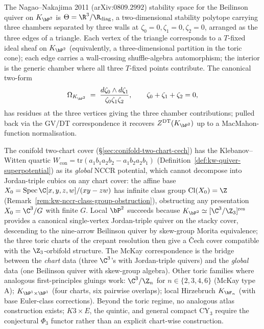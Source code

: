 \begin{remark}
\label{rem:local-p2-stability-polytope}
The Nagao--Nakajima 2011 (arXiv:$0809.2992$) stability space for the Beilinson quiver on $K_{\bP^2}$ is $\Theta = \R^3/\R_{\mathrm{diag}}$, a two-dimensional stability polytope carrying three chambers separated by three walls at $\zeta_0 = 0, \zeta_1 = 0, \zeta_2 = 0$, arranged as the three edges of a triangle. Each vertex of the triangle corresponds to a $T$-fixed ideal sheaf on $K_{\bP^2}$ (equivalently, a three-dimensional partition in the toric cone); each edge carries a wall-crossing shuffle-algebra automorphism; the interior is the generic chamber where all three $T$-fixed points contribute. The canonical two-form
\[
 \Omega_{K_{\bP^2}} \;=\; \frac{d\zeta_0 \wedge d\zeta_1}{\zeta_0 \zeta_1 \zeta_2}, \qquad \zeta_0 + \zeta_1 + \zeta_2 = 0,
\]
has residues at the three vertices giving the three chamber contributions; pulled back via the GV/DT correspondence it recovers $Z^{\mathrm{DT}}(K_{\bP^2})$ up to a MacMahon-function normalisation.
\end{remark}

\begin{remark}
\label{rem:local-p2-conifold-contrast}
The conifold two-chart cover (§\ref{sec:conifold-two-chart-cech}) has the Klebanov--Witten quartic $W_{\mathrm{con}} = \mathrm{tr}(a_1 b_1 a_2 b_2 - a_1 b_2 a_2 b_1)$ (Definition~\ref{def:kw-quiver-superpotential}) as its \emph{global} NCCR potential, which cannot decompose into Jordan-triple cubics on any chart cover: the affine base $X_0 = \mathrm{Spec}\,\C[x,y,z,w]/(xy-zw)$ has infinite class group $\mathrm{Cl}(X_0) = \Z$ (Remark~\ref{rem:kw-nccr-class-group-obstruction}), obstructing any presentation $X_0 = \C^3/G$ with finite $G$. Local $\bP^2$ succeeds because $K_{\bP^2} \simeq [\C^3/\Z_3]^{\mathrm{res}}$ provides a canonical single-vertex Jordan-triple quiver on the stacky cover, descending to the nine-arrow Beilinson quiver by skew-group Morita equivalence; the three toric charts of the crepant resolution then give a \v{C}ech cover compatible with the $\Z_3$-orbifold structure. The McKay correspondence is the bridge between the \emph{chart} data (three $\C^3$'s with Jordan-triple quivers) and the \emph{global} data (one Beilinson quiver with skew-group algebra). Other toric families where analogous first-principles gluings work: $\C^3/\Z_n$ for $n \in \{2, 3, 4, 6\}$ (McKay type A); $K_{\bP^1 \times \bP^1}$ (four charts, six pairwise overlaps); local Hirzebruch $K_{\bF_n}$ (with base Euler-class corrections). Beyond the toric regime, no analogous atlas construction exists; $K3 \times E$, the quintic, and general compact CY$_3$ require the conjectural $\Phi_3$ functor rather than an explicit chart-wise construction.
\end{remark}

